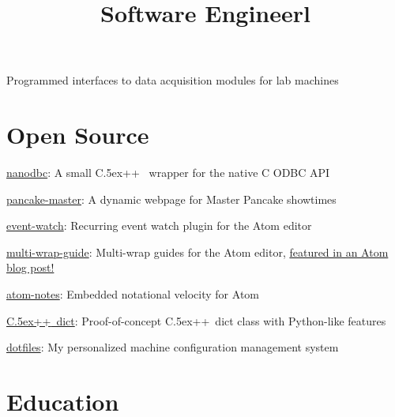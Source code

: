 \documentclass[12pt, tweaklist, line]{res}
\let\tempone\itemize
\let\temptwo\enditemize
\renewenvironment{itemize}{\tempone\vspace{-.15in}\setlength{\topsep}{0pt}\setlength{\itemsep}{3pt}\vspace{-.15in}}{\temptwo}
\def\Cplusplus{{\rm C\raise.5ex\hbox{\small ++}}}
\begin{document}
\begin{resume}
\title{Software Engineer}
\begin{position}
\begin{itemize}
\item Programmed interfaces to data acquisition modules for lab machines
\end{itemize}
\end{position}

\pagebreak

\section{Open Source}
\begin{itemize}
\vspace{.55in} %
\item \href{http://nanodbc.io}{nanodbc}: A small \Cplusplus~ wrapper for the native C ODBC API
\item \href{http://pancake.lexicalunit.com}{pancake-master}: A dynamic webpage for Master Pancake showtimes
\item \href{https://atom.io/packages/event-watch}{event-watch}: Recurring event watch plugin for the Atom editor
\item \href{https://atom.io/packages/multi-wrap-guide}{multi-wrap-guide}: Multi-wrap guides for the Atom editor, \href{http://blog.atom.io/2015/08/06/new-package-roundup.html}{featured in an Atom blog post!}
\item \href{https://github.com/lexicalunit/atom-notes}{atom-notes}: Embedded notational velocity for Atom
\item \href{https://github.com/lexicalunit/dict}{\Cplusplus~dict}: Proof-of-concept \Cplusplus~dict class with Python-like features
\item \href{https://github.com/lexicalunit/dotfiles}{dotfiles}: My personalized machine configuration management system
\end{itemize}

\section{Education}
\begin{format}
  \\
  \title{l}\\
  \body\\
\end{format}


\end{resume}
\end{document}
